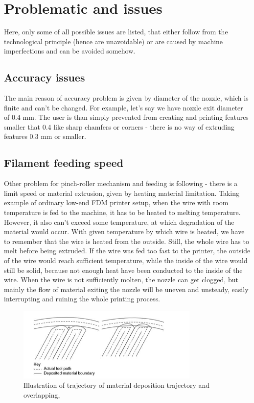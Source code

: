 \documentclass[a4paper, 11pt, reqno]{report}
\begin{document}
\section{Problematic and issues}
Here, only some of all possible issues are listed, that either follow from the technological principle (hence are unavoidable) or are caused by machine imperfections and can be avoided somehow.
\subsection{Accuracy issues}
The main reason of accuracy problem is given by diameter of the nozzle, which is finite and can't be changed. For example, let's say we have nozzle exit diameter of 0.4 mm. The user is than simply prevented from creating and printing features smaller that 0.4 like sharp chamfers or corners - there is no way of extruding features 0.3 mm or smaller.

\subsection{Filament feeding speed}
	Other problem for pinch-roller mechanism and feeding is following - there is a limit speed or material extrusion, given by heating material limitation. Taking example of ordinary low-end FDM printer setup, when the wire with room temperature is fed to the machine, it has to be heated to melting temperature. However, it  also can't exceed some temperature, at which degradation of the material would occur. With given temperature by which wire is heated, we have to remember that the wire is heated from the outside. Still, the whole wire has to melt before being extruded. If the wire was fed too fast to the printer, the outside of the wire would reach sufficient temperature, while the inside of the wire would still be solid, because not enough heat have been conducted to the inside of the wire. When the wire is not sufficiently molten, the nozzle can get clogged, but mainly the flow of material exiting the nozzle will be uneven and unsteady, easily interrupting and ruining the whole printing process.
	
\begin{figure}[t]%
	\centering
 	\includegraphics[width=0.8\textwidth]{depositionIllustration}
	\caption{Illustration of trajectory of material deposition trajectory and overlapping, \cite[p. 159]{AMT}}
\end{figure}
\end{document}

